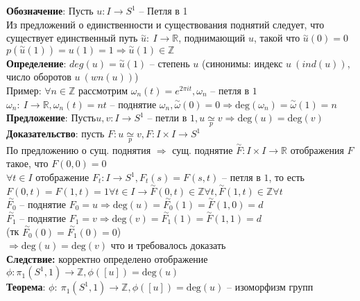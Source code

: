 	\textbf{Обозначение}: Пусть $u: I \rightarrow S^1$ -- Петля в 1\\
	Из предложений о единственности и существования поднятий следует, что существует единственный путь $\overset{\sim}{u}:\ I \rightarrow \mathbb{R}$, поднимающий $u$, такой что $\overset{\sim}{u} (0) = 0$\\
	$p( \overset{\sim}{u} (1)) = u(1) = 1 \Rightarrow \overset{\sim}{u} (1) \in \mathbb{Z}$\\
	\textbf{Определение}: $deg(u) = \overset{\sim}{u} (1)$ -- степень $u$ (синонимы: индекс $u\ (ind(u))$, число оборотов $u\ (wn(u))$)\\
	Пример: $\forall n \in \mathbb{Z}$ рассмотрим ${\omega}_n (t) = e^{2\pi it}, {\omega}_n$ -- петля в $1$\\
	${\omega}_n:\ I \rightarrow \mathbb{R}, {\omega}_n (t) = nt$ -- поднятие ${\omega}_n, \overset{\sim}{\omega} (0) = 0 \Rightarrow \text{deg}({\omega}_n) = \overset{\sim}{\omega} (1) = n$\\
	\textbf{Предложение}: $Пусть u,v: I \rightarrow S^1$ -- петли в $1, u \underset{p}{\simeq} v \Rightarrow \text{deg}(u) = \text{deg}(v)$\\
	\textbf{Доказательство}: пусть $F: u \underset{p}{\simeq} v, F: I \times I \rightarrow S^1$\\
	По предложению о сущ. поднятия $\Rightarrow$ сущ. поднятие $\overset{\sim}{F}: I\times I \rightarrow \mathbb{R}$ отображения $F$ такое, что $F(0,0) = 0$\\
	$\forall t \in I$ отображение $F_t: I\rightarrow S^1, F_t (s) = F(s,t)$ -- петля в $1$, то есть $F(0,t) = F(1,t) = 1 \forall t\in I \rightarrow \overset{\sim}{F} (0,t) \in \mathbb{Z} \forall t, \overset{\sim}{F} (1,t) \in \mathbb{Z} \forall t$\\
	$\overset{\sim}{F_0}$ -- поднятие $F_0 = u \Rightarrow \text{deg}(u) = \overset{\sim}{F_0} (1) = \overset{\sim}{F} (1,0) = d$\\
	$\overset{\sim}{F_1}$ -- поднятие $F_1 = v \Rightarrow \text{deg}(v) = \overset{\sim}{F_1} (1) = \overset{\sim}{F} (1,1) = d$\\
	(тк $\overset{\sim}{F_0} (0) = \overset{\sim}{F_1} (0) = 0$)\\
	$\Rightarrow \text{deg}(u) = \text{deg}(v)$ что и требовалось доказать\\
	\textbf{Следствие:} корректно определено отображение $\phi: {\pi}_1 (S^1, 1) \rightarrow \mathbb{Z}, \phi ([u]) = \text{deg}(u)$\\
	\textbf{Теорема}: $\phi:\ {\pi}_1 (S^1, 1) \rightarrow \mathbb{Z}, \phi ([u]) = \text{deg}(u)$ -- изоморфизм групп\\
